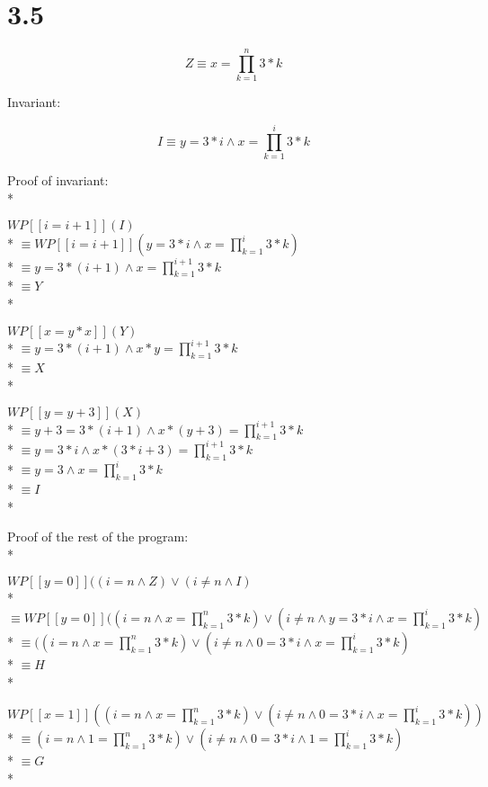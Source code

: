 \documentclass{article}
\begin{document}
\section*{3.5}

$$ Z \equiv x=\prod_{k=1}^{n} 3*k $$

Invariant:

$$ I \equiv y=3*i \land x=\prod_{k=1}^{i} 3*k $$

Proof of invariant: \\*

$ WP[\![i=i+1]\!](I) $ \\*
$ \equiv WP[\![i=i+1]\!](y=3*i \land x=\prod_{k=1}^{i} 3*k) $ \\*
$ \equiv y=3*(i+1) \land x=\prod_{k=1}^{i+1}3*k $ \\*
$ \equiv Y $ \\*

$ WP[\![x=y*x]\!](Y) $ \\*
$ \equiv y=3*(i+1) \land x*y=\prod_{k=1}^{i+1}3*k $ \\*
$ \equiv X $ \\*

$ WP[\![y=y+3]\!](X) $ \\*
$ \equiv y+3=3*(i+1) \land x*(y+3)=\prod_{k=1}^{i+1}3*k $ \\*
$ \equiv y=3*i \land x*(3*i+3)=\prod_{k=1}^{i+1}3*k $ \\*
$ \equiv y=3 \land x=\prod_{k=1}^{i}3*k $ \\*
$ \equiv I $ \\*

Proof of the rest of the program: \\*

$ WP[\![y=0]\!]((i=n \land Z) \lor (i\ne n \land I) $ \\*
$ \equiv WP[\![y=0]\!]((i=n \land x=\prod_{k=1}^{n} 3*k) \lor (i \ne n \land y=3*i \land x=\prod_{k=1}^{i}3*k) $ \\*
$ \equiv ((i=n \land x=\prod_{k=1}^{n} 3*k) \lor (i \ne n \land 0=3*i \land x=\prod_{k=1}^{i}3*k) $ \\*
$ \equiv H $ \\*

$ WP[\![x=1]\!]((i=n \land x=\prod_{k=1}^{n} 3*k) \lor (i \ne n \land 0=3*i \land x=\prod_{k=1}^{i}3*k)) $ \\*
$ \equiv (i=n \land 1=\prod_{k=1}^{n} 3*k) \lor (i \ne n \land 0=3*i \land 1=\prod_{k=1}^{i}3*k) $ \\*
$ \equiv G $ \\*
\end{document}
